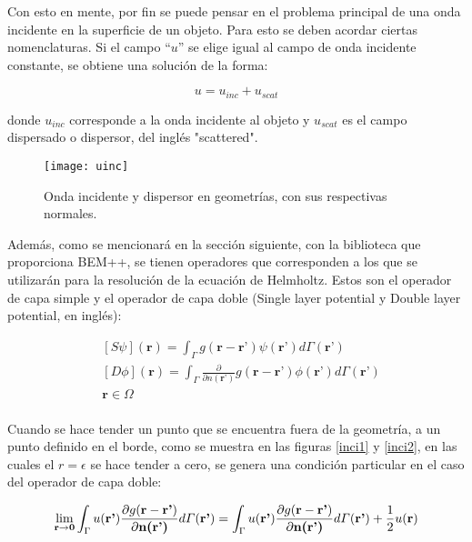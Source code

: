 \documentclass[12pt,letterpaper]{report}
\numberwithin{equation}{section}
\begin{document}
Con esto en mente, por fin se puede pensar en el problema principal de una onda incidente en la superficie de un objeto. Para esto se deben acordar ciertas nomenclaturas. Si el campo ``$u$'' se elige igual al campo de onda incidente constante, se obtiene una solución de la forma:

\begin{equation}
	u = u_{inc} + u_{scat}
	\label{u}
\end{equation} 

\noindent donde $u_{inc}$ corresponde a la onda incidente al objeto y $u_{scat}$ es el campo dispersado o dispersor, del inglés "scattered".

\begin{figure}[H]
	\centering
	\texttt{[image: uinc]}
	\caption{Onda incidente y dispersor en geometrías, con sus respectivas normales. \cite{Multitrace_acoustic} }
\end{figure}

Además, como se mencionará en la sección siguiente, con la biblioteca que proporciona BEM++, se tienen operadores que corresponden a los que se utilizarán para la resolución de la ecuación de Helmholtz. Estos son el operador de capa simple y el operador de capa doble (Single layer potential y Double layer potential, en inglés):


\begin{equation}
\begin{split}
&[S\psi](\textbf{r})=\int_{\Gamma}g(\textbf{r}-\textbf{r'})\psi(\textbf{r'}) d\varGamma(\textbf{r'})\\
&[D\phi](\textbf{r})=\int_{\Gamma}\frac{\partial}{\partial n(\textbf{r'})} g(\textbf{r}-\textbf{r'})\phi(\textbf{r'}) d\varGamma(\textbf{r'})\\  
&\textbf{r}\in\Omega\\
\end{split}
\label{ecuacionoperadores}
\end{equation}

Cuando se hace tender un punto que se encuentra fuera de la geometría, a un punto definido en el borde, como se muestra en las figuras \ref{inci1} y \ref{inci2}, en las cuales el $r=\epsilon$ se hace tender a cero, se genera una condición particular en el caso del operador de capa doble:

$$\lim\limits_{\textbf{r}\rightarrow \textbf{0}}\int_{\Gamma}u(\textbf{r'})\frac{\partial g(\textbf{r}-\textbf{r'})}{\partial\textbf{n(\textbf{r'})}}d\varGamma(\textbf{r'})=\int_{\Gamma}u(\textbf{r'})\frac{\partial g(\textbf{r}-\textbf{r'})}{\partial\textbf{n(\textbf{r'})}}d\varGamma(\textbf{r'}) + \frac{1}{2}u(\textbf{r})$$
\end{document}
